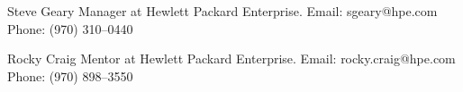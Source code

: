 

\begin{cvskills}

  \cvskill
    {Steve Geary} %
    {Manager at Hewlett Packard Enterprise. Email: sgeary@hpe.com Phone: (970) 310--0440} %

  \cvskill
    {Rocky Craig} %
    {Mentor at Hewlett Packard Enterprise. Email: rocky.craig@hpe.com Phone: (970) 898--3550} %
\end{cvskills}
